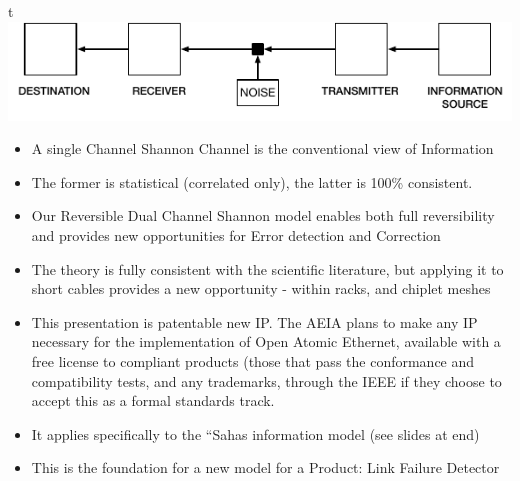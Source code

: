 \documentclass[../HFT-main.tex]{subfiles}
\begin{document}
\begin{marginfigure}t
  \centering
  \includegraphics[width=1.2\linewidth]{../figures/One-Way-Shannon-RL.pdf}
\vspace{10pt}
\end{marginfigure}



\begin{itemize}
\item A single Channel Shannon Channel is the conventional view of Information

\item The former is statistical (correlated only), the latter is 100\% consistent.
\item Our Reversible Dual Channel Shannon model enables both full reversibility and provides new opportunities for Error detection and Correction
\item The theory is fully consistent with the scientific literature, but applying it to short cables provides a new opportunity - within racks, and chiplet meshes
\item This presentation is patentable new IP. The AEIA plans to make any IP necessary for the implementation of Open Atomic Ethernet, available with a free license to compliant products (those that pass the conformance and compatibility tests, and any trademarks, through the IEEE if they choose to accept this as a formal standards track.
\item It applies specifically to the “Sahas information model (see slides at end)
\item This is the foundation for a new model for a Product: Link Failure Detector 
\end{itemize}

\end{document}
